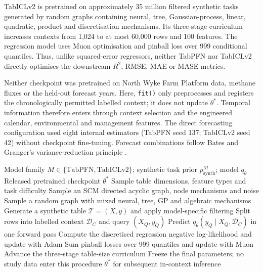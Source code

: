 TabICLv2 is pretrained on approximately 35 million filtered synthetic tasks
generated by random graphs containing neural, tree, Gaussian-process, linear,
quadratic, product and discretisation mechanisms.  Its three-stage curriculum
increases contexts from 1,024 to at most 60,000 rows and 100 features.  The
regression model uses Muon optimisation and pinball loss over 999 conditional
quantiles.  Thus, unlike squared-error regressors, neither TabPFN nor TabICLv2
directly optimises the downstream $R^2$, RMSE, MAE or MASE metrics.

Neither checkpoint was pretrained on North Wyke Farm Platform data, methane
fluxes or the held-out forecast years.  Here, \texttt{fit()} only preprocesses
and registers the chronologically permitted labelled context; it does not
update $\theta^*$.  Temporal information therefore enters through context
selection and the engineered calendar, environmental and management features.
The direct forecasting configuration used eight internal estimators (TabPFN
seed 137; TabICLv2 seed 42) without checkpoint fine-tuning.  Forecast
combinations follow Bates and Granger's variance-reduction principle
\cite{bates1969combination}.

\begin{algorithm}[H]
\caption{Published offline pretraining scheme for TabPFN and TabICLv2}
\label{alg:app-pfn-pretraining}
\small
\begin{algorithmic}[1]
\Require Model family $M\in\{\mathrm{TabPFN},\mathrm{TabICLv2}\}$;
synthetic task prior $p_{\mathrm{synth}}^M$; model $q_\theta$
\Ensure Released pretrained checkpoint $\theta^*$
    \State Sample table dimensions, feature types and task difficulty
        \State Sample an SCM directed acyclic graph, node mechanisms and noise
    \Else
        \State Sample a random graph with mixed neural, tree, GP and algebraic mechanisms
    \EndIf
    \State Generate a synthetic table $\mathcal T=(X,y)$ and apply model-specific filtering
    \State Split rows into labelled context $\mathcal D_C$ and query $(X_Q,y_Q)$
    \State Predict $q_\theta(y_Q\mid X_Q,\mathcal D_C)$ in one forward pass
        \State Compute the discretised regression negative log-likelihood and update with Adam
    \Else
        \State Sum pinball losses over 999 quantiles and update with Muon
        \State Advance the three-stage table-size curriculum
    \EndIf
\EndFor
\State Freeze the final parameters; no study data enter this procedure
\State \Return $\theta^*$ for subsequent in-context inference
\end{algorithmic}
\end{algorithm}

